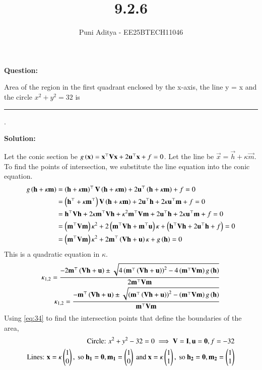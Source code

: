 \documentclass[journal]{IEEEtran}
\begin{document}
\title{9.2.6}
\author{Puni Aditya - EE25BTECH11046}
\maketitle

\textbf{Question:}

Area of the region in the first quadrant enclosed by the x-axis, the line y = x and the circle $x^2 + y^2 = 32$ is \rule{2cm}{0.4pt}.

\textbf{Solution:}

Let the conic section be $g\left(\mathbf{x}\right) = \mathbf{x}^\top\mathbf{V}\mathbf{x} + 2\mathbf{u}^\top\mathbf{x} + f = 0$.
Let the line be $\vec{x} = \vec{h} + \kappa\vec{m}$.
To find the points of intersection, we substitute the line equation into the conic equation.
\begin{align}
    g\left(\mathbf{h}+\kappa\mathbf{m}\right) &= \left(\mathbf{h}+\kappa\mathbf{m}\right)^\top\mathbf{V}\left(\mathbf{h}+\kappa\mathbf{m}\right) + 2\mathbf{u}^\top\left(\mathbf{h}+\kappa\mathbf{m}\right) + f = 0 \\
    &= \left(\mathbf{h}^\top + \kappa\mathbf{m}^\top\right)\mathbf{V}\left(\mathbf{h}+\kappa\mathbf{m}\right) + 2\mathbf{u}^\top\mathbf{h} + 2\kappa\mathbf{u}^\top\mathbf{m} + f = 0 \\
    &= \mathbf{h}^\top\mathbf{V}\mathbf{h} + 2\kappa\mathbf{m}^\top\mathbf{V}\mathbf{h} + \kappa^2\mathbf{m}^\top\mathbf{V}\mathbf{m} + 2\mathbf{u}^\top\mathbf{h} + 2\kappa\mathbf{u}^\top\mathbf{m} + f = 0 \\
    &= \left(\mathbf{m}^\top\mathbf{V}\mathbf{m}\right)\kappa^2 + 2\left(\mathbf{m}^\top\mathbf{V}\mathbf{h} + \mathbf{m}^\top\mathbf{u}\right)\kappa + \left(\mathbf{h}^\top\mathbf{V}\mathbf{h} + 2\mathbf{u}^\top\mathbf{h} + f\right) = 0 \\
    &= \left(\mathbf{m}^\top\mathbf{V}\mathbf{m}\right)\kappa^2 + 2\mathbf{m}^\top\left(\mathbf{V}\mathbf{h} + \mathbf{u}\right)\kappa + g\left(\mathbf{h}\right) = 0
\end{align}
This is a quadratic equation in $\kappa$.
\begin{align}
    \kappa_{1,2} = \frac{-2\mathbf{m}^\top\left(\mathbf{V}\mathbf{h}+\mathbf{u}\right) \pm \sqrt{4\left(\mathbf{m}^\top\left(\mathbf{V}\mathbf{h}+\mathbf{u}\right)\right)^2 - 4\left(\mathbf{m}^\top\mathbf{V}\mathbf{m}\right)g\left(\mathbf{h}\right)}}{2\mathbf{m}^\top\mathbf{V}\mathbf{m}} \\
    \kappa_{1,2} = \frac{-\mathbf{m}^\top\left(\mathbf{V}\mathbf{h}+\mathbf{u}\right) \pm \sqrt{\left(\mathbf{m}^\top\left(\mathbf{V}\mathbf{h}+\mathbf{u}\right)\right)^2 - \left(\mathbf{m}^\top\mathbf{V}\mathbf{m}\right)g\left(\mathbf{h}\right)}}{\mathbf{m}^\top\mathbf{V}\mathbf{m}} \label{eq:34}
\end{align}
Using \eqref{eq:34} to find the intersection points that define the boundaries of the area,
\begin{align*}
    \text{Circle: } x^2+y^2-32 = 0 \implies \mathbf{V}=\mathbf{I}, \mathbf{u}=\mathbf{0}, f=-32 \\
    \text{Lines: } \mathbf{x} = \kappa\begin{pmatrix}1 \\ 0\end{pmatrix},\text{ so } \mathbf{h_1}=\mathbf{0}, \mathbf{m_1}=\begin{pmatrix}1 \\ 0\end{pmatrix}\text{ and } \mathbf{x} = \kappa\begin{pmatrix}1 \\ 1\end{pmatrix},\text{ so } \mathbf{h_2}=\mathbf{0}, \mathbf{m_2}=\begin{pmatrix}1 \\ 1\end{pmatrix}
\end{align*}
\end{document}
